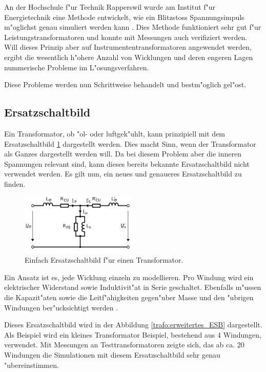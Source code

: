 \begin{refsection}
An der Hochschule f"ur Technik Rapperswil wurde am Institut f"ur Energietechnik eine Methode entwickelt, wie ein Blitzstoss Spannungsimpuls m"oglichst genau simuliert werden kann \cite{trafo:BILImpulse}. Dies Methode funktioniert sehr gut f"ur Leistungstransformatoren und konnte mit Messungen auch verifiziert werden. 
Will dieses Prinzip aber auf Instrumententransformatoren angewendet werden, ergibt die wesentlich h"ohere Anzahl von Wicklungen und deren engeren Lagen nummerische Probleme im L"osungsverfahren. 

Diese Probleme werden nun Schrittweise behandelt und bestm"oglich gel"ost. 


\subsection{Ersatzschaltbild}
Ein Transformator, ob "ol- oder luftgek"uhlt, kann prinzipiell mit dem Ersatzschaltbild \ref{trafo:einfaches_ESB} dargestellt werden. Dies macht Sinn, wenn der Transformator als Ganzes dargestellt werden will. Da bei diesem Problem aber die inneren Spannungen relevant sind, kann dieses bereits bekannte Ersatzschaltbild nicht verwendet werden. Es gilt nun, ein neues und genaueres Ersatzschaltbild zu finden. 

\begin{figure}
	\centering
	\includegraphics[width=0.5\textwidth]{./trafo/images/Einfaches_ESB.png}
	\caption[Einfach Ersatzschaltbild f"ur einen Transformator]{Einfach Ersatzschaltbild f"ur einen Transformator.}
	\label{trafo:einfaches_ESB}
\end{figure}

Ein Ansatz ist es, jede Wicklung einzeln zu modellieren. Pro Windung wird ein elektrischer Widerstand sowie Induktivit"at in Serie geschaltet. Ebenfalls m"ussen die Kapazit"aten sowie die Leitf"ahigkeiten gegen"uber Masse und den "ubrigen Windungen ber"ucksichtigt werden \cite{trafo:BILImpulse}. 

Dieses Ersatzschaltbild wird in der Abbildung \ref{trafo:erweitertes_ESB} dargestellt. Als Beispiel wird ein kleines Transformator Beispiel, bestehend aus 4 Windungen, verwendet. Mit Messungen an Testtransformatoren zeigte sich, das ab ca. 20 Windungen die Simulationen mit diesem Ersatzschaltbild sehr genau "ubereinstimmen. 


\end{refsection}
